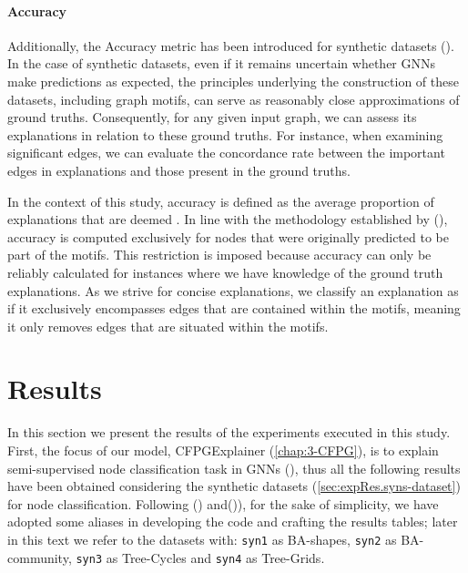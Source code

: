 \documentclass[binding=0.6cm]{sapthesis}
\newcommand{\mycite}[1]{(\cite{#1})}
\begin{document}
\paragraph{Accuracy}
\label{sec:expRes.accuracy}
Additionally, the Accuracy metric has been introduced for synthetic datasets \mycite{ying2019-gnnexplainer,sanchez2020-attributeGNNs}. In the case of synthetic datasets, even if it remains uncertain whether GNNs make predictions as expected, the principles underlying the construction of these datasets, including graph motifs, can serve as reasonably close approximations of ground truths. Consequently, for any given input graph, we can assess its explanations in relation to these ground truths. For instance, when examining significant edges, we can evaluate the concordance rate between the important edges in explanations and those present in the ground truths.

In the context of this study, accuracy is defined as the average proportion of explanations that are deemed . In line with the methodology established by \mycite{ying2019-gnnexplainer,luo2020-pgexplainer}, accuracy is computed exclusively for nodes that were originally predicted to be part of the motifs. This restriction is imposed because accuracy can only be reliably calculated for instances where we have knowledge of the ground truth explanations.
As we strive for concise explanations, we classify an explanation as  if it exclusively encompasses edges that are contained within the motifs, meaning it only removes edges that are situated within the motifs.


\newpage
\section{Results}
\label{sec:expRes.res}
In this section we present the results of the experiments executed in this study. First, the focus of our model, CFPGExplainer (\cref{chap:3-CFPG}), is to explain semi-supervised node classification task in GNNs (\cite{kipf2016-semisupervised}), thus all the following results have been obtained considering the synthetic datasets (\cref{sec:expRes.syns-dataset}) for node classification. Following \mycite{luo2020-pgexplainer} and\mycite{spinelli2022-mate-maml}), for the sake of simplicity, we have adopted some aliases in developing the code and crafting the results tables; later in this text we refer to the datasets with: \texttt{syn1} as BA-shapes, \texttt{syn2} as BA-community, \texttt{syn3} as Tree-Cycles and \texttt{syn4} as Tree-Grids. 
\end{document}
